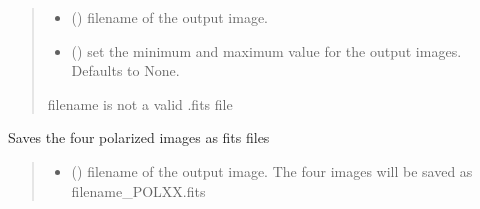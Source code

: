 \documentclass[letterpaper,10pt,english]{sphinxmanual}
\begin{document}
\begin{fulllineitems}
\begin{fulllineitems}
\begin{quote}
\begin{description}
\begin{itemize}
\item {} 
\sphinxAtStartPar
{} () \textendash{} filename of the output image.

\item {} 
\sphinxAtStartPar
{} (\sphinxstyleliteralemphasis{\sphinxupquote{{[}}}\sphinxstyleliteralemphasis{\sphinxupquote{, }}\sphinxstyleliteralemphasis{\sphinxupquote{{]}}}\sphinxstyleliteralemphasis{\sphinxupquote{, }}) \textendash{} set the minimum and maximum value for the output images. Defaults to None.

\end{itemize}

\sphinxAtStartPar
{} \textendash{} filename is not a valid .fits file

\end{description}\end{quote}

\end{fulllineitems}


\begin{fulllineitems}
\label{\detokenize{micropolarray:micropolarray.micropol_image.MicropolImage.save_single_pol_images}}
\pysigstartsignatures
{}
\pysigstopsignatures
\sphinxAtStartPar
Saves the four polarized images as fits files
\begin{quote}\begin{description}
\begin{itemize}
\item {} 
\sphinxAtStartPar
{} () \textendash{} filename of the output image. The four images will be saved as filename\_POLXX.fits


\end{itemize}
\end{description}
\end{quote}
\end{fulllineitems}
\end{fulllineitems}
\end{document}
